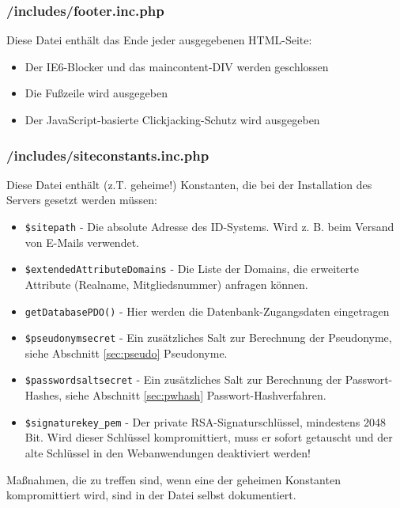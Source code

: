 \documentclass[parskip=half]{scrartcl}
\begin{document}
\subsubsection{/includes/footer.inc.php}
Diese Datei enthält das Ende jeder ausgegebenen HTML-Seite:
\begin{itemize}
	\item Der IE6-Blocker und das maincontent-DIV werden geschlossen
	\item Die Fußzeile wird ausgegeben
	\item Der JavaScript-basierte Clickjacking-Schutz wird ausgegeben
\end{itemize}

\subsubsection{/includes/siteconstants.inc.php}
Diese Datei enthält (z.T. geheime!) Konstanten, die bei der Installation des Servers gesetzt werden müssen:
\begin{itemize}
	\item \texttt{\$sitepath} - Die absolute Adresse des ID-Systems. Wird z. B. beim Versand von E-Mails verwendet.
	\item \texttt{\$extendedAttributeDomains} - Die Liste der Domains, die erweiterte Attribute (Realname, Mitgliedsnummer) anfragen können.
	\item \texttt{getDatabasePDO()} - Hier werden die Datenbank-Zugangsdaten eingetragen
	\item \texttt{\$pseudonymsecret} - Ein zusätzliches Salt zur Berechnung der Pseudonyme, siehe Abschnitt \ref{sec:pseudo} Pseudonyme.
	\item \texttt{\$passwordsaltsecret} - Ein zusätzliches Salt zur Berechnung der Passwort-Hashes, siehe Abschnitt \ref{sec:pwhash} Passwort-Hashverfahren.
	\item \texttt{\$signaturekey\_pem} - Der private RSA-Signaturschlüssel, mindestens 2048 Bit.
		Wird dieser Schlüssel kompromittiert, muss er sofort getauscht und der alte Schlüssel in den Webanwendungen deaktiviert werden!
\end{itemize}
Maßnahmen, die zu treffen sind, wenn eine der geheimen Konstanten kompromittiert wird, sind in der Datei selbst dokumentiert.
\end{document}
